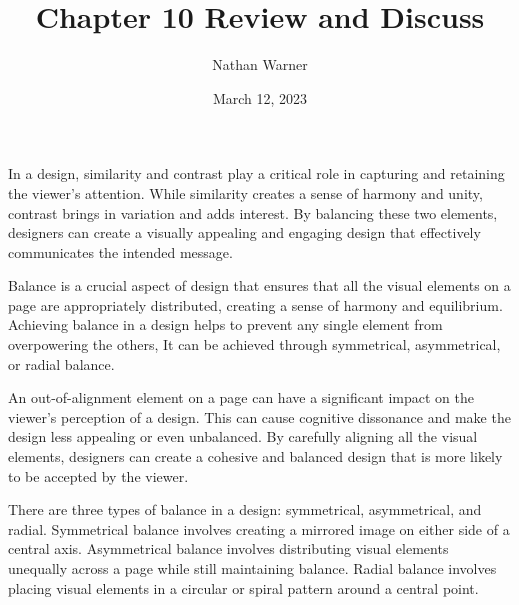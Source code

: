 \documentclass{report}
\title{\Huge{Chapter 10 Review and Discuss}}
\author{\huge{Nathan Warner}}
\date{\huge{March 12, 2023}}
\begin{document}
    \maketitle
    \bigbreak \noindent 
    \bigbreak \noindent 
    In a design, similarity and contrast play a critical role in capturing and retaining the viewer's attention.
    While similarity creates a sense of harmony and unity, contrast brings in variation and adds interest.
    By balancing these two elements, designers can create a visually appealing and engaging design that effectively communicates the intended message.

    \bigbreak \noindent \bigbreak \noindent 
    \bigbreak \noindent 
    \bigbreak \noindent 
    Balance is a crucial aspect of design that ensures that all the visual elements on a page are appropriately distributed, creating a sense of harmony and equilibrium.
    Achieving balance in a design helps to prevent any single element from overpowering the others,
    It can be achieved through symmetrical, asymmetrical, or radial balance.

    \bigbreak \noindent \bigbreak \noindent 
    \bigbreak \noindent 
    \bigbreak \noindent 
    An out-of-alignment element on a page can have a significant impact on the viewer's perception of a design.
    This can cause cognitive dissonance and make the design less appealing or even unbalanced.
    By carefully aligning all the visual elements, designers can create a cohesive and balanced design that is more likely to be accepted by the viewer.
    
    
    \bigbreak \noindent \bigbreak \noindent 
    \bigbreak \noindent 
    \bigbreak \noindent 
    There are three types of balance in a design: symmetrical, asymmetrical, and radial.
    Symmetrical balance involves creating a mirrored image on either side of a central axis.
    Asymmetrical balance involves distributing visual elements unequally across a page while still maintaining balance.
    Radial balance involves placing visual elements in a circular or spiral pattern around a central point.
    
\end{document}
